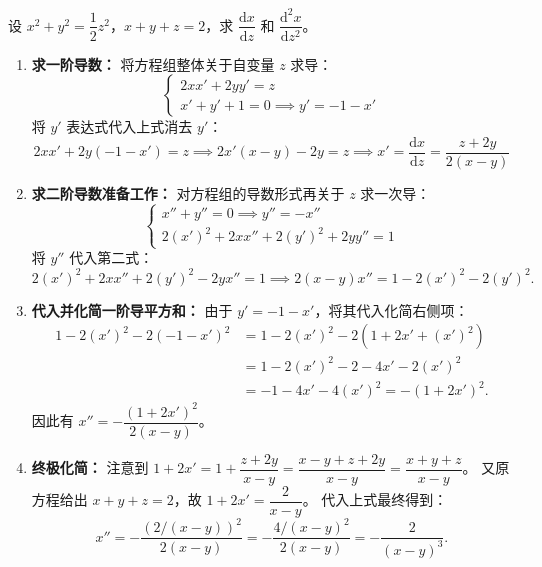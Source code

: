 \documentclass[lang=cn,11pt]{elegantbook}
\begin{document}
\begin{exercise}[方程组隐函数的高阶导数]
设 $x^2 + y^2 = \dfrac{1}{2}z^2$，$x + y + z = 2$，求 $\dfrac{\mathrm{d}x}{\mathrm{d}z}$ 和 $\dfrac{\mathrm{d}^2x}{\mathrm{d}z^2}$。
\end{exercise}
\begin{solution}
\begin{enumerate}
  \item \textbf{求一阶导数：}
  将方程组整体关于自变量 $z$ 求导：
  \[
  \begin{cases}
  2x x' + 2y y' = z \\
  x' + y' + 1 = 0 \implies y' = -1 - x'
  \end{cases}
  \]
  将 $y'$ 表达式代入上式消去 $y'$：
  \[ 2x x' + 2y(-1 - x') = z \implies 2x'(x-y) - 2y = z \implies x' =\dfrac{\mathrm{d}x}{\mathrm{d}z} = \dfrac{z+2y}{2(x-y)}\]

  \item \textbf{求二阶导数准备工作：}
  对方程组的导数形式再关于 $z$ 求一次导：
  \[
  \begin{cases}
  x'' + y'' = 0 \implies y'' = -x'' \\
  2(x')^2 + 2x x'' + 2(y')^2 + 2y y'' = 1
  \end{cases}
  \]
  将 $y''$ 代入第二式：
  \[ 2(x')^2 + 2x x'' + 2(y')^2 - 2y x'' = 1 \implies 2(x-y)x'' = 1 - 2(x')^2 - 2(y')^2. \]
  
  \item \textbf{代入并化简一阶导平方和：}
  由于 $y' = -1 - x'$，将其代入化简右侧项：
  \begin{align*}
  1 - 2(x')^2 - 2(-1-x')^2 &= 1 - 2(x')^2 - 2(1 + 2x' + (x')^2) \\
  &= 1 - 2(x')^2 - 2 - 4x' - 2(x')^2 \\
  &= -1 - 4x' - 4(x')^2 = -(1 + 2x')^2.
  \end{align*}
  因此有 $x'' = -\dfrac{(1+2x')^2}{2(x-y)}$。

  \item \textbf{终极化简：}
  注意到 $1+2x' = 1 + \dfrac{z+2y}{x-y} = \dfrac{x-y+z+2y}{x-y} = \dfrac{x+y+z}{x-y}$。
  又原方程给出 $x+y+z=2$，故 $1+2x' = \dfrac{2}{x-y}$。
  代入上式最终得到：
  \[ x'' = -\frac{(2/(x-y))^2}{2(x-y)} = -\frac{4/(x-y)^2}{2(x-y)} = -\frac{2}{(x-y)^3}. \]
\end{enumerate}
\end{solution}
\end{document}
